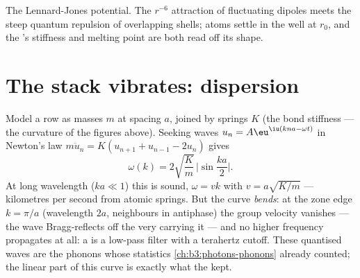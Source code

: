 \begin{omfigure}

{\small The Lennard-Jones potential. The $r^{-6}$ attraction of
fluctuating dipoles meets the steep quantum repulsion of
overlapping shells; atoms settle in the well at $r_0$, and the
's stiffness and melting point are both read off its shape.}
\end{omfigure}

\section{The stack vibrates: dispersion}

\begin{theorem}\label{thm:b3:crystalline-solids:dispersion}
Model a  row as masses $m$ at spacing $a$, joined by springs
$K$ (the bond stiffness --- the curvature of the figures above).
Seeking waves $u_n = A\eu^{\iu(kna - \omega t)}$ in Newton's law
$m\ddot u_n = K(u_{n+1} + u_{n-1} - 2u_n)$ gives
\[
\omega(k) = 2\sqrt{\frac{K}{m}}\,\Big|\sin\frac{ka}{2}\Big| .
\]
At long wavelength ($ka \ll 1$) this is sound, $\omega = vk$ with
$v = a\sqrt{K/m}$ --- kilometres per second from atomic springs.
But the curve \emph{bends}: at the zone edge $k = \pi/a$
(wavelength $2a$, neighbours in antiphase) the group velocity
vanishes --- the wave Bragg-reflects off the very  carrying
it --- and no higher frequency propagates at all: a  is a
low-pass filter with a terahertz cutoff. These quantised waves are
the phonons whose statistics \cref{ch:b3:photons-phonons} already
counted; the linear part of this curve is exactly what the  kept.
\end{theorem}

